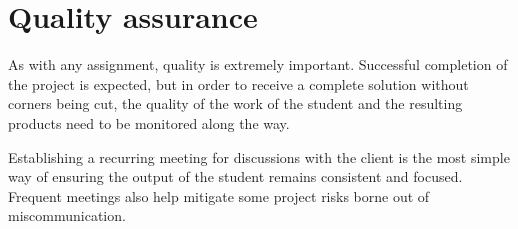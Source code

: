 \documentclass{report}
\begin{document}

	
	
	
	
	
	
	
	\chapter{Quality assurance}\label{quality_assurance}
	As with any assignment, quality is extremely important. Successful completion of the project is expected, but in order to receive a complete solution without corners being cut, the quality of the work of the student and the resulting products need to be monitored along the way.
	
	Establishing a recurring meeting for discussions with the client is the most simple way of ensuring the output of the student remains consistent and focused. Frequent meetings also help mitigate some project risks borne out of miscommunication.
	
\end{document}
